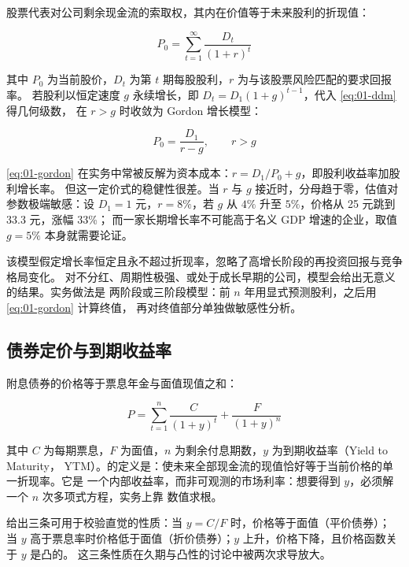 股票代表对公司剩余现金流的索取权，其内在价值等于未来股利的折现值：

\begin{equation}\label{eq:01-ddm}
  P_0 = \sum_{t=1}^{\infty} \frac{D_t}{(1+r)^t}
\end{equation}

其中 $P_0$ 为当前股价，$D_t$ 为第 $t$ 期每股股利，$r$ 为与该股票风险匹配的要求回报率。
若股利以恒定速度 $g$ 永续增长，即 $D_t = D_1(1+g)^{t-1}$，代入 \cref{eq:01-ddm} 得几何级数，
在 $r > g$ 时收敛为 Gordon 增长模型：

\begin{equation}\label{eq:01-gordon}
  P_0 = \frac{D_1}{r-g}, \qquad r > g
\end{equation}

\cref{eq:01-gordon} 在实务中常被反解为资本成本：$r = D_1/P_0 + g$，即股利收益率加股利增长率。
但这一定价式的稳健性很差。当 $r$ 与 $g$ 接近时，分母趋于零，估值对参数极端敏感：设
$D_1 = 1$ 元，$r = 8\%$，若 $g$ 从 $4\%$ 升至 $5\%$，价格从 25 元跳到 33.3 元，涨幅 33\%；
而一家长期增长率不可能高于名义 GDP 增速的企业，取值 $g = 5\%$ 本身就需要论证。

\begin{warningbox}
该模型假定增长率恒定且永不超过折现率，忽略了高增长阶段的再投资回报与竞争格局变化。
对不分红、周期性极强、或处于成长早期的公司，模型会给出无意义的结果。实务做法是
两阶段或三阶段模型：前 $n$ 年用显式预测股利，之后用 \cref{eq:01-gordon} 计算终值，
再对终值部分单独做敏感性分析。
\end{warningbox}

\subsection{债券定价与到期收益率}

附息债券的价格等于票息年金与面值现值之和：

\begin{equation}\label{eq:01-bondprice}
  P = \sum_{t=1}^{n} \frac{C}{(1+y)^t} + \frac{F}{(1+y)^n}
\end{equation}

其中 $C$ 为每期票息，$F$ 为面值，$n$ 为剩余付息期数，$y$ 为到期收益率（Yield to Maturity，
YTM）。的定义是：使未来全部现金流的现值恰好等于当前价格的单一折现率。它是
一个内部收益率，而非可观测的市场利率：想要得到 $y$，必须解一个 $n$ 次多项式方程，实务上靠
数值求根。

 给出三条可用于校验直觉的性质：当 $y = C/F$ 时，价格等于面值（平价债券）；
当 $y$ 高于票息率时价格低于面值（折价债券）；$y$ 上升，价格下降，且价格函数关于 $y$ 是凸的。
这三条性质在久期与凸性的讨论中被两次求导放大。

